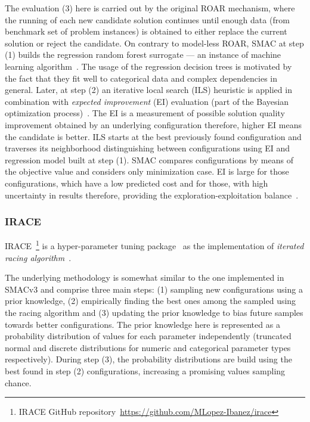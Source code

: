 The evaluation (3) here is carried out by the original ROAR mechanism, where the running of each new candidate solution continues until enough data (from benchmark set of problem instances) is obtained to either replace the current solution or reject the candidate. On contrary to model-less ROAR, SMAC at step (1) builds the regression random forest surrogate — an instance of machine learning algorithm~\cite{breiman2001random}. The usage of the regression decision trees is motivated by the fact that they fit well to categorical data and complex dependencies in general. Later, at step (2) an iterative local search (ILS) heuristic is applied in combination with \emph{expected improvement} (EI) evaluation (part of the Bayesian optimization process)~\cite{shahriari2015taking}. The EI is a measurement of possible solution quality improvement obtained by an underlying configuration therefore, higher EI means the candidate is better. ILS starts at the best previously found configuration and traverses its neighborhood distinguishing between configurations using EI and regression model built at step (1). SMAC compares configurations by means of the objective value and considers only minimization case. EI is large for those configurations, which have a low predicted cost and for those, with high uncertainty in results therefore, providing the exploration-exploitation balance~\cite{jones1998efficient}.


\subsubsection{IRACE}\label{bg: irace}
IRACE~\footnote{IRACE GitHub repository~\url{https://github.com/MLopez-Ibanez/irace}} is a hyper-parameter tuning package~\cite{lopez2016irace} as the implementation of \emph{iterated racing algorithm}~\cite{birattari2010f}.

The underlying methodology is somewhat similar to the one implemented in SMACv3 and comprise three main steps: (1) sampling new configurations using a prior knowledge, (2) empirically finding the best ones among the sampled using the racing algorithm and (3) updating the prior knowledge to bias future samples towards better configurations. The prior knowledge here is represented as a probability distribution of values for each parameter independently (truncated normal and discrete distributions for numeric and categorical parameter types respectively). During step (3), the probability distributions are build using the best found in step (2) configurations, increasing a promising values sampling chance.

